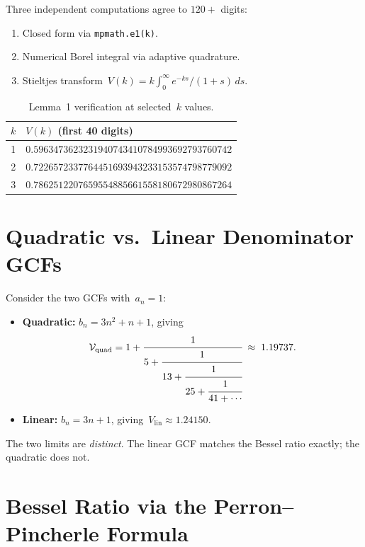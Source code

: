 \documentclass[11pt,a4paper]{article}
\begin{document}
Three independent computations agree to $120{+}$ digits:
\begin{enumerate}
  \item Closed form via \texttt{mpmath.e1(k)}.
  \item Numerical Borel integral via adaptive quadrature.
  \item Stieltjes transform~$V(k) = k\int_0^\infty e^{-ks}/(1+s)\,ds$.
\end{enumerate}

\begin{table}[ht]
\centering
\caption{Lemma~1 verification at selected~$k$ values.}
\label{tab:lemma1}
\begin{tabular}{@{}cl@{}}
\toprule
$k$ & $V(k)$ (first 40 digits) \\
\midrule
1 & $0.5963473623231940743410784993692793760742$ \\
2 & $0.7226572337764451693943233153574798779092$ \\
3 & $0.7862512207659554885661558180672980867264$ \\
\bottomrule
\end{tabular}
\end{table}

\section{Quadratic vs.\ Linear Denominator GCFs}\label{sec:quad_vs_lin}

Consider the two GCFs with~$a_n = 1$:
\begin{itemize}
  \item \textbf{Quadratic:} $b_n = 3n^2 + n + 1$, giving
  \[
    \mathcal{V}_{\mathrm{quad}} = 1 + \cfrac{1}{5 + \cfrac{1}{13 + \cfrac{1}{25 + \cfrac{1}{41 + \cdots}}}} \;\approx\; 1.19737.
  \]
  \item \textbf{Linear:} $b_n = 3n+1$, giving~$V_{\mathrm{lin}} \approx 1.24150$.
\end{itemize}
The two limits are \emph{distinct}. The linear GCF matches the Bessel ratio exactly; the quadratic does not.

\section{Bessel Ratio via the Perron--Pincherle Formula}\label{sec:perron}
\end{document}
